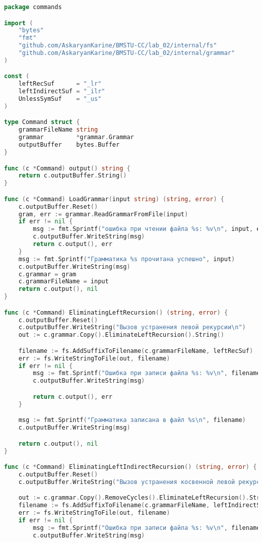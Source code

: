 \begin{lstlisting}[language=Go, caption={Код модуля \textit{commands}}]
package commands

import (
	"bytes"
	"fmt"
	"github.com/AskaryanKarine/BMSTU-CC/lab_02/internal/fs"
	"github.com/AskaryanKarine/BMSTU-CC/lab_02/internal/grammar"
)

const (
	leftRecSuf      = "_lr"
	leftIndirectSuf = "_ilr"
	UnlessSymSuf    = "_us"
)

type Command struct {
	grammarFileName string
	grammar         *grammar.Grammar
	outputBuffer    bytes.Buffer
}

func (c *Command) output() string {
	return c.outputBuffer.String()
}

func (c *Command) LoadGrammar(input string) (string, error) {
	c.outputBuffer.Reset()
	gram, err := grammar.ReadGrammarFromFile(input)
	if err != nil {
		msg := fmt.Sprintf("ошибка при чтении файла %s: %v\n", input, err)
		c.outputBuffer.WriteString(msg)
		return c.output(), err
	}
	msg := fmt.Sprintf("Грамматика %s прочитана успешно", input)
	c.outputBuffer.WriteString(msg)
	c.grammar = gram
	c.grammarFileName = input
	return c.output(), nil
}

func (c *Command) EliminatingLeftRecursion() (string, error) {
	c.outputBuffer.Reset()
	c.outputBuffer.WriteString("Вызов устранения левой рекурсии\n")
	out := c.grammar.Copy().EliminateLeftRecursion().String()

	filename := fs.AddSuffixToFilename(c.grammarFileName, leftRecSuf)
	err := fs.WriteStringToFile(out, filename)
	if err != nil {
		msg := fmt.Sprintf("Ошибка при записи файла %s: %v\n", filename, err)
		c.outputBuffer.WriteString(msg)

		return c.output(), err
	}

	msg := fmt.Sprintf("Грамматика записана в файл %s\n", filename)
	c.outputBuffer.WriteString(msg)

	return c.output(), nil
}

func (c *Command) EliminatingLeftIndirectRecursion() (string, error) {
	c.outputBuffer.Reset()
	c.outputBuffer.WriteString("Вызов устранения косвенной левой рекурсии\n")

	out := c.grammar.Copy().RemoveCycles().EliminateLeftRecursion().String()
	filename := fs.AddSuffixToFilename(c.grammarFileName, leftIndirectSuf)
	err := fs.WriteStringToFile(out, filename)
	if err != nil {
		msg := fmt.Sprintf("Ошибка при записи файла %s: %v\n", filename, err)
		c.outputBuffer.WriteString(msg)


\end{lstlisting}
